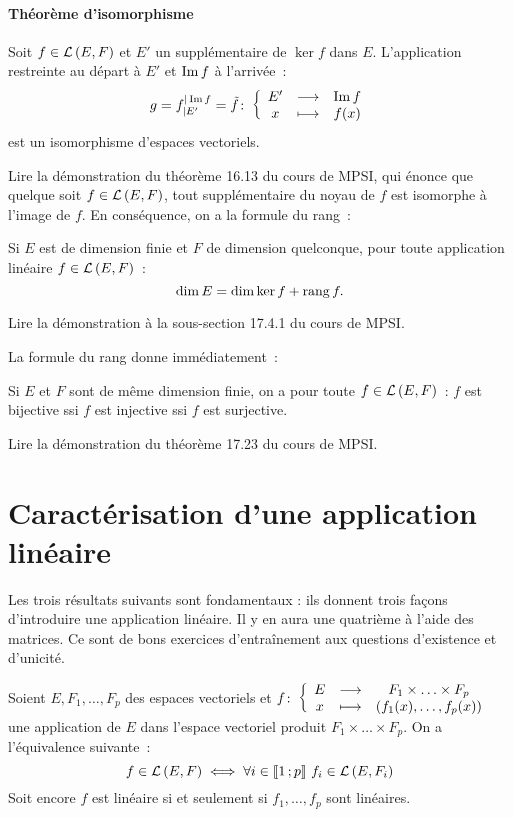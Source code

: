 \paragraph{Théorème d'isomorphisme}
\begin{theo}
	Soit $f \in \mathcal{L}\left(E,F\right)$ et $E'$ un supplémentaire de $\ker{f}$ dans $E$. L'application restreinte au départ à $E'$ et $\operatorname{Im}{f}$ à l'arrivée~:
	\begin{equation}
		g=f_{|E'}^{|\operatorname{Im}{f}} = \tilde{f}\colon \left\{\begin{array}{ccc} E' & \longrightarrow &\operatorname{Im}{f}\\ x & \longmapsto & f(x) \end{array} \right.
	\end{equation}
	est un isomorphisme d'espaces vectoriels.
\end{theo}
Lire la démonstration du théorème 16.13 du cours de MPSI, qui énonce que quelque soit $f \in \mathcal{L}\left(E,F\right)$, tout supplémentaire du noyau de $f$ est isomorphe à l'image de $f$.
En conséquence, on a la formule du rang~:
\begin{corth}
	Si $E$ est de dimension finie et $F$ de dimension quelconque, pour toute application linéaire $f \in \mathcal{L}\left(E,F\right)$~:
	\begin{equation}
		\operatorname{dim}{E} = \operatorname{dim}{\ker{f}} + \operatorname{rang}{f}.
	\end{equation}
\end{corth}
Lire la démonstration à la sous-section 17.4.1 du cours de MPSI.

La formule du rang donne immédiatement~:
\begin{corth}
	Si $E$ et $F$ sont de même dimension finie, on a pour toute $f \in \mathcal{L}\left(E,F\right)$~: $f$ est bijective ssi $f$ est injective ssi $f$ est surjective.
\end{corth}
Lire la démonstration du théorème 17.23 du cours de MPSI.

\section{Caractérisation d'une application linéaire}

Les trois résultats suivants sont fondamentaux : ils donnent trois façons d'introduire une application linéaire. Il y en aura une quatrième à l'aide des matrices. Ce sont de bons exercices d'entraînement aux questions d'existence et d'unicité.

\begin{theo}
	Soient $E, F_1, \ldots, F_p$ des espaces vectoriels et $f\colon \left\{\begin{array}{ccc} E & \longrightarrow &F_1 \times \ldots \times F_p\\ x & \longmapsto & (f_1(x), \ldots, f_p(x)) \end{array} \right.$ une application de $E$ dans l'espace vectoriel produit $F_1 \times \ldots \times F_p$. On a l'équivalence suivante~:
	\begin{equation}
		f \in \mathcal{L}\left(E,F\right) \iff \forall i \in \mathopen{\llbracket}1\mathclose{}\mathpunct{};p\mathclose{\rrbracket} \ f_i \in \mathcal{L}\left(E,F_i\right)
	\end{equation}
Soit encore $f$ est linéaire si et seulement si $f_1, \ldots, f_p$ sont linéaires.
\end{theo}
